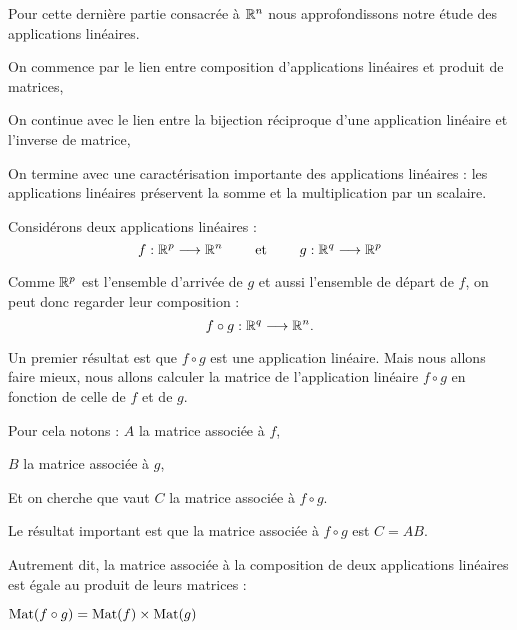 






\debuttexte


\diapo

\change
Pour cette dernière partie consacrée à $\mathbb{R}^n$ nous approfondissons
notre étude des applications linéaires.

\change
On commence par le lien entre composition d'applications linéaires 
et produit de matrices,

\change
On continue avec le lien entre la bijection réciproque d'une application linéaire 
et l'inverse de matrice,

\change
On termine avec une caractérisation importante des applications linéaires :
les applications linéaires préservent la somme et la multiplication par un scalaire.


\diapo

Considérons deux applications linéaires :
$$f : \mathbb{R}^p \longrightarrow \mathbb{R}^n \qquad \text{ et } \qquad g : \mathbb{R}^q \longrightarrow \mathbb{R}^p$$

\change
Comme $\mathbb{R}^p$ est l'ensemble d'arrivée de $g$ et aussi l'ensemble de départ de $f$,
on peut donc regarder leur composition :
$$
f \circ g :  \mathbb{R}^q \longrightarrow \mathbb{R}^n.
$$

\change
Un premier résultat est que $f \circ g$ est une application linéaire.
Mais nous allons faire mieux, nous allons calculer la matrice de l'application linéaire
$f\circ g$ en fonction de celle de $f$ et de $g$.

\change
Pour cela notons : 
$A$ la matrice associée à $f$,

\change
$B$ la matrice associée à $g$,

\change
Et on cherche que vaut $C$ la matrice associée à $f \circ g$.

\change
Le résultat important est que la matrice associée à $f\circ g$ est $C=AB$.

\change
Autrement dit, la matrice associée à la composition de deux applications linéaires est 
égale au produit de leurs matrices :

$\mathop{\mathrm{Mat}}\nolimits(f \circ g) = \mathop{\mathrm{Mat}}\nolimits (f) \times \mathop{\mathrm{Mat}}\nolimits (g)$

